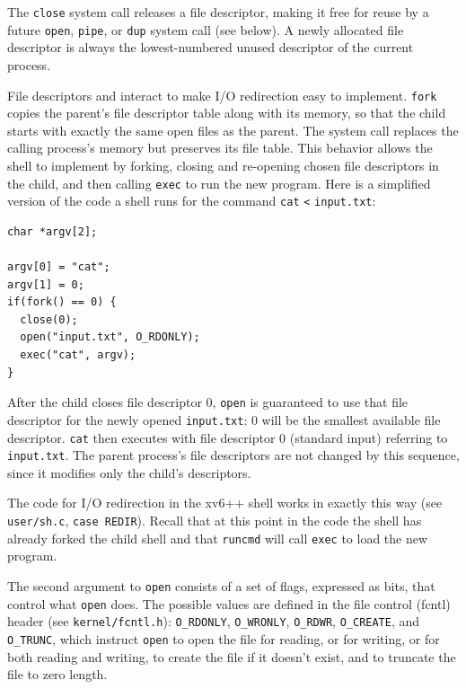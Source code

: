 The
\lstinline{close}
system call
releases a file descriptor, making it free for reuse by a future
\lstinline{open},
\lstinline{pipe},
or
\lstinline{dup}
system call (see below).
A newly allocated file descriptor
is always the lowest-numbered unused
descriptor of the current process.

File descriptors and
interact to make I/O redirection easy to implement.
\lstinline{fork}
copies the parent's file descriptor table along with its memory,
so that the child starts with exactly the same open files as the parent.
The system call
replaces the calling process's memory but preserves its file table.
This behavior allows the shell to
implement  by forking,
closing and re-opening chosen file descriptors in the child,
and then calling \lstinline{exec} to run the new program.
Here is a simplified version of the code a shell runs for the
command
\lstinline{cat}
\lstinline{<}
\lstinline{input.txt}:
\begin{lstlisting}[]
char *argv[2];

argv[0] = "cat";
argv[1] = 0;
if(fork() == 0) {
  close(0);
  open("input.txt", O_RDONLY);
  exec("cat", argv);
}
\end{lstlisting}
After the child closes file descriptor 0,
\lstinline{open}
is guaranteed to use that file descriptor
for the newly opened
\lstinline{input.txt}:
0 will be the smallest available file descriptor.
\lstinline{cat}
then executes with file descriptor 0 (standard input) referring to
\lstinline{input.txt}.
The parent process's file descriptors are not changed by this
sequence, since it modifies only the child's descriptors.

The code for I/O redirection in the xv6++ shell works in exactly this way
(see \texttt{user/sh.c}, \texttt{case REDIR}).
Recall that at this point in the code the shell has already forked the
child shell and that
\lstinline{runcmd}
will call
\lstinline{exec}
to load the new program.

The second argument to \lstinline{open} consists of a set of
flags, expressed as bits, that control what \lstinline{open}
does. The possible values are defined in the file control (fcntl) header
(see \texttt{kernel/fcntl.h}):
\lstinline{O_RDONLY},
\lstinline{O_WRONLY},
\lstinline{O_RDWR},
\lstinline{O_CREATE}, and
\lstinline{O_TRUNC},
which instruct \lstinline{open} to
open the file for reading,
or for writing,
or for both reading and writing,
to create the file if it doesn't exist,
and to truncate the file to zero length.

